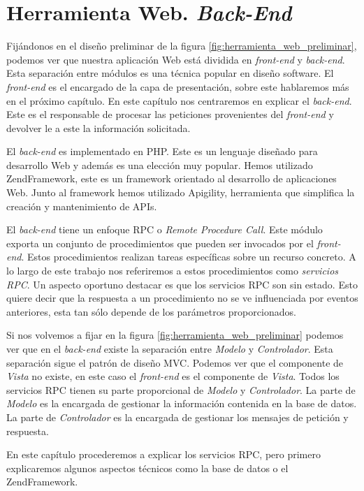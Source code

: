 \chapter{Herramienta Web. \emph{Back-End}}
\label{backend}

Fijándonos en el diseño preliminar de la figura \ref{fig:herramienta_web_preliminar}, podemos ver que nuestra aplicación Web está dividida en
\emph{front-end} y \emph{back-end}. Esta separación entre módulos es una técnica popular en diseño software. El \emph{front-end} es el encargado de la
capa de presentación, sobre este hablaremos más en el próximo capítulo. En este capítulo nos centraremos en explicar el \emph{back-end}. Este es el
responsable de procesar las peticiones provenientes del \emph{front-end} y devolver le a este la información solicitada. 
\par
El \emph{back-end} es implementado en PHP\cite{PHP}. Este es un lenguaje diseñado para desarrollo Web y además es una elección muy popular. Hemos
utilizado ZendFramework\cite{ZF}, este es un framework orientado al desarrollo de aplicaciones Web. Junto al framework hemos utilizado
Apigility\cite{Apigility}, herramienta que simplifica la creación y mantenimiento de APIs.
\par
El \emph{back-end} tiene un enfoque RPC o \emph{Remote Procedure Call}. Este módulo exporta un conjunto de procedimientos que pueden ser invocados por
el \emph{front-end}. Estos procedimientos realizan tareas específicas sobre un recurso concreto. A lo largo de este trabajo nos referiremos a estos
procedimientos como \emph{servicios RPC}. Un aspecto oportuno destacar es que los servicios RPC son sin estado. Esto quiere decir que la respuesta a
un procedimiento no se ve influenciada por eventos anteriores, esta tan sólo depende de los parámetros proporcionados.
\par
Si nos volvemos a fijar en la figura \ref{fig:herramienta_web_preliminar} podemos ver que en el \emph{back-end} existe la separación entre
\emph{Modelo} y \emph{Controlador}. Esta separación sigue el patrón de diseño MVC\cite{MVCWiki}. Podemos ver que el componente de \emph{Vista} no
existe, en este caso el \emph{front-end} es el componente de \emph{Vista}. Todos los servicios RPC tienen su parte proporcional de \emph{Modelo} y
\emph{Controlador}. La parte de \emph{Modelo} es la encargada de gestionar la información contenida en la base de datos. La parte de
\emph{Controlador} es la encargada de gestionar los mensajes de petición y respuesta.
\par
En este capítulo procederemos a explicar los servicios RPC, pero primero explicaremos algunos aspectos técnicos como la base de datos o el
ZendFramework.
